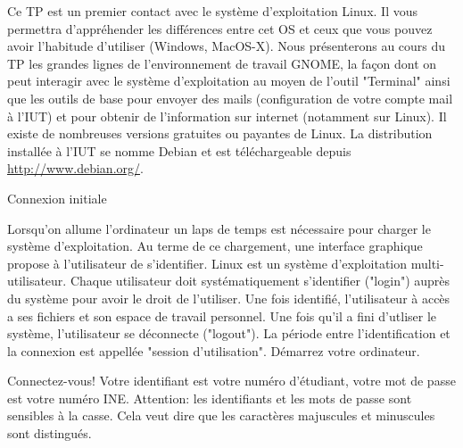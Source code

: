\begin{exercice}
  Ce TP est un premier contact avec le système d'exploitation Linux. Il
  vous permettra d'appréhender les différences entre cet OS et ceux que
  vous pouvez avoir l'habitude d'utiliser (Windows, MacOS-X). Nous
  présenterons au cours du TP les grandes lignes de l'environnement de
  travail GNOME, la façon dont on peut interagir avec le système
  d'exploitation au moyen de l'outil "Terminal" ainsi que les outils de
  base pour envoyer des mails (configuration de votre compte mail à
  l'IUT) et pour obtenir de l'information sur internet (notamment sur
  Linux). Il existe de nombreuses versions gratuites ou payantes de
  Linux. La distribution installée à l'IUT se nomme Debian et est
  téléchargeable depuis \url{http://www.debian.org/}.
  \begin{exercicelet}{Connexion initiale}
    \begin{questions}
    \item Lorsqu'on allume l'ordinateur un laps de temps est nécessaire
      pour charger le système d'exploitation. Au terme de ce chargement,
      une interface graphique propose à l'utilisateur de s'identifier.
      Linux est un système d'exploitation multi-utilisateur. Chaque
      utilisateur doit systématiquement s'identifier ("login") auprès du
      système pour avoir le droit de l'utiliser. Une fois identifié,
      l'utilisateur à accès a ses fichiers et son espace de travail
      personnel. Une fois qu'il a fini d'utliser le système,
      l'utilisateur se déconnecte ("logout"). La période entre
      l'identification et la connexion est appellée "session
      d'utilisation". Démarrez votre ordinateur.
    \item Connectez-vous! Votre identifiant est votre numéro d'étudiant,
      votre mot de passe est votre numéro INE.  Attention: les
      identifiants et les mots de passe sont sensibles à la casse. Cela
      veut dire que les caractères majuscules et minuscules sont
      distingués.
    \end{questions}
  \end{exercicelet}
\end{exercice}


